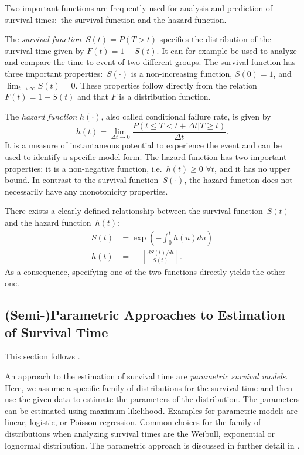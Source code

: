 \documentclass[12pt, a4paper]{scrartcl}
\theoremstyle{definition}
\theoremstyle{plain}
\numberwithin{equation}{section}
\numberwithin{figure}{section}
\numberwithin{table}{section}
\begin{document}
	
	Two important functions are frequently used for analysis and prediction of survival times:~the survival function and the hazard function.
	
	The \emph{survival function}~$S(t) = P(T > t)$ specifies the distribution of the survival time given by $F(t) = 1 - S(t)$.
	It can for example be used to analyze and compare the time to event of two different groups.
	The survival function has three important properties:~$S(\cdot)$ is a non-increasing function, $S(0)=1$, and $\lim_{t \to \infty} S(t)=0$.
	These properties follow directly from the relation $F(t)=1-S(t)$ and that $F$ is a distribution function.
	
	The \emph{hazard function} $h(\cdot)$, also called conditional failure rate, is given by
	\begin{equation*}
		h(t) = \lim_{\Delta t \to 0}\frac{P(t \leq T < t + \Delta t \vert T \geq t)}{\Delta t}.
	\end{equation*} 
	It is a measure of instantaneous potential to experience the event and can be used to identify a specific model form.
	The hazard function has two important properties: it is a non-negative function, i.e.~$h(t) \geq 0$ $ \forall t$, and it has no upper bound.
	In contrast to the survival function~$S(\cdot)$, the hazard function does not necessarily have any monotonicity properties.

	There exists a clearly defined relationship between the survival function~$S(t)$ and the hazard function~$h(t)$:
	\begin{equation*}
	\begin{split}
		S(t) &={} \exp \left( - \int_{0}^{t}h(u)du\right) \\
		h(t) & ={} - \left[ \frac{dS(t)/dt}{S(t)}\right].
	\end{split}
	\end{equation*}
	As a consequence, specifying one of the two functions directly yields the other one.

	
	\subsection{(Semi-)Parametric Approaches to Estimation of Survival Time} \label{cox}

	This section follows \citet*{sabook}.
	
	An approach to the estimation of survival time are \emph{parametric survival models}.
	Here, we assume a specific family of distributions for the survival time and then use the given data to estimate the parameters of the distribution.
	The parameters can be estimated using maximum likelihood.
	Examples for parametric models are linear, logistic, or Poisson regression.
	Common choices for the family of distributions when analyzing survival times are the Weibull, exponential or lognormal distribution.
	The parametric approach is discussed in further detail in \citet*{sabook}.
	
\end{document}
